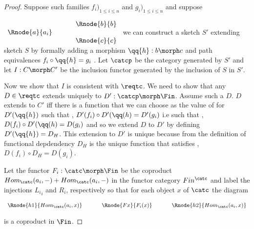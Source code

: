 \begin{proof}
Suppose such families $f_i)_{1 \le i \leq n}$ and $g_i)_{1 \le i \leq n}$ and suppose 

$
\begin{array}{c p{0.5cm} c  }
             &&   \Rnode{b}{b} \\[0.01cm]
\Rnode{a}{a_i} &&                \\[0.01cm] 
             &&   \Rnode{c}{c}         
\end{array} 
$
 we can construct a sketch $S'$ extending sketch $S$ 
 by formally adding a morphism $\qq{h}: b \morph c$
and path equivalences $f_i \circ \qq{h} = g_i$ \foreachi. 
Let $\catcp$ be the category generated by $S'$ and
let $I: C \morph C'$ be the inclusion functor generated by the inclusion of $S$ in $S'$. 

Now we show that $I$ is consistent with $\reqtc$. We need to show that any $D \in \reqtc$
extends uniquely to $D' :\catcp \morph \Fin$. Assume such a $D$. 
$D$  extends to $C'$ iff there is a  function that 
we can choose as the value of  for $D'(\qq{h})$  
such that \foreachi, $D'(f_i) \circ D'(\qq(h) = D'(g_i)$ i.e such that
\foreachi, $D(f_i) \circ D'(\qq(h) = D(g_i)$ and so we  extend $D$ to $D'$ 
 by defining $D'(\qq{h})=D_H$.
This extension to $D'$ is unique because from the definition of functional depdendency
$D_H$ is the unique function that satisfies \foreachi, $D(f_i) \circ D_H = D(g_i)$.

Let the functor $F_i: \catc \morph \Fin$ be the coproduct $Hom_{\catc}(a_i,-) + Hom_{\catc}(a_i,-)$
in the functor category $Fin^{\catc}$ and label the injections ${L_i}_i$ and $R_i$, respectively so that
for each object $x$ of $\catc$ the diagram
\begin{center}
$
\begin{array}{c p{0.5cm} c p{0.5cm} c  }
\Rnode{h1}{Hom_{\catc}(a_i,x)}  &&\Rnode{Fx}{F_i(x)}  &&   \Rnode{h2}{Hom_{\catc}(a_i,x)}       
\end{array} 
$
\end{center}
is a coproduct in $\Fin$.


\end{proof}

